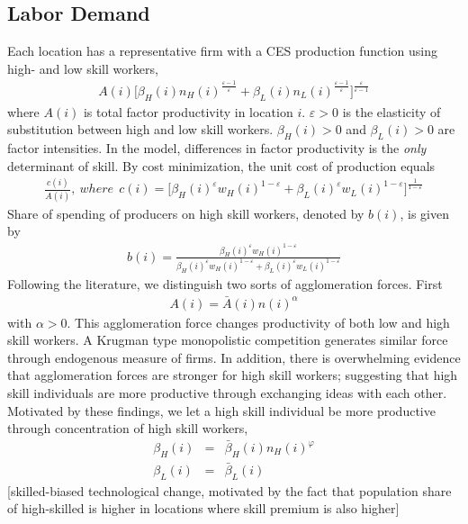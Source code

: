 \documentclass{article}
\begin{document}
\subsection{Labor Demand}
Each location has a representative firm with a CES production function using high- and low skill workers,
\begin{eqnarray}
	 A(i)\Big[ \beta_H(i) n_H(i)^{\frac{\varepsilon-1}{\varepsilon}} + \beta_L(i) n_L(i)^{\frac{\varepsilon-1}{\varepsilon}} \Big]^{\frac{\varepsilon}{\varepsilon-1}} \nonumber
\end{eqnarray}
where $A(i)$ is total factor productivity in location $i$. $\varepsilon>0$ is the elasticity of substitution between high and low skill workers. $\beta_H(i)>0$ and $\beta_L(i)>0$ are factor intensities. In the model, differences in factor productivity is the \textit{only} determinant of skill.
By cost minimization, the unit cost of production equals
\begin{eqnarray}\label{eq:unit_cost}
	 \frac{c(i)}{A(i)} ,~where~~c(i)=\Big[ \beta_H(i)^{\varepsilon} w_H(i)^{1-\varepsilon} + \beta_L(i)^{\varepsilon} w_L(i)^{1-\varepsilon}\Big]^{\frac{1}{1-\varepsilon}}
\end{eqnarray}
Share of spending of producers on high skill workers, denoted by $b(i)$, is given by
\begin{eqnarray}\label{eq:input_share}
	b(i) = \frac{\beta_H(i)^{\varepsilon} w_H(i)^{1-\varepsilon}}{\beta_H(i)^{\varepsilon} w_H(i)^{1-\varepsilon} + \beta_L(i)^{\varepsilon} w_L(i)^{1-\varepsilon}}
\end{eqnarray}
Following the literature, we distinguish two sorts of agglomeration forces. First 
\begin{eqnarray}\label{eq:agglom_general}
A(i) = \bar{A}(i) n(i)^{\alpha}
\end{eqnarray}
with $\alpha>0$. This agglomeration force changes productivity of both low and high skill workers. A Krugman type monopolistic competition generates similar force through endogenous measure of firms. In addition, there is overwhelming evidence that agglomeration forces are stronger for high skill workers; suggesting that high skill individuals are more productive through exchanging ideas with each other. Motivated by these findings, we let a high skill individual be more productive through concentration of high skill workers,
\begin{eqnarray}\label{eq:agglom_specific}
	\beta_H(i) & = & \bar{\beta}_H(i) n_H(i)^{\varphi} \nonumber \\
	\beta_L(i) & = & \bar{\beta}_L(i)
\end{eqnarray}
[skilled-biased technological change, motivated by the fact that population share of high-skilled is higher in locations where skill premium is also higher]
\end{document}
